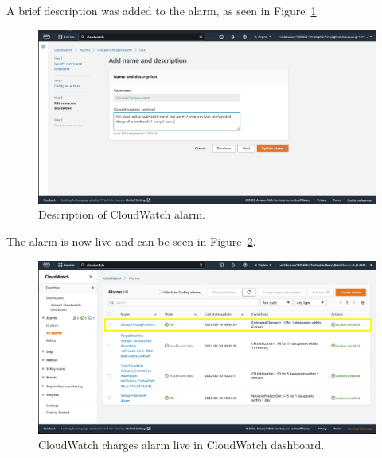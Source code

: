 A brief description was added to the alarm, as seen in Figure~\ref{fig:cloudwatch-charges-description}.

\begin{figure}[!htbp]
    \centering
    \includegraphics[width=\textwidth]{resources/cloudwatch/cloudwatch-charges-description}
    \caption{Description of CloudWatch alarm.}
    \label{fig:cloudwatch-charges-description}
\end{figure}

\clearpage
The alarm is now live and can be seen in Figure~\ref{fig:cloudwatch-charges-dashboard}.

\begin{figure}[!htbp]
    \centering
    \includegraphics[width=\textwidth]{resources/cloudwatch/cloudwatch-charges-dashboard}
    \caption{CloudWatch charges alarm live in CloudWatch dashboard.}
    \label{fig:cloudwatch-charges-dashboard}
\end{figure}











